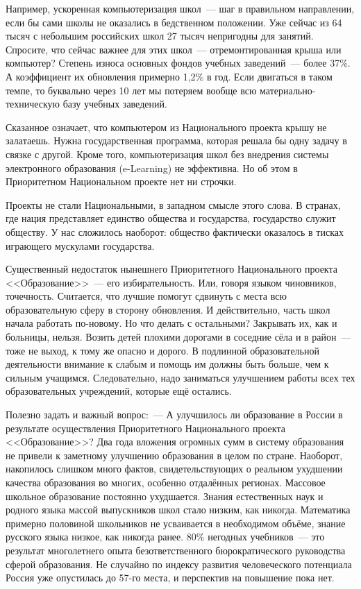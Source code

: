 \documentclass[article, 12pt, russian, oneside]{ncc}
\begin{document}
Например, ускоренная компьютеризация школ~--- шаг в правильном
направлении, если бы сами школы не оказались в бедственном
положении. Уже сейчас из 64 тысяч с небольшим российских школ 27 тысяч
непригодны для занятий. Спросите, что сейчас важнее для этих школ~---
отремонтированная крыша или компьютер? Степень износа основных фондов
учебных заведений~--- более 37\%. А коэффициент их обновления примерно
1,2\% в год. Если двигаться в таком темпе, то буквально через 10 лет
мы потеряем вообще всю материально-техническую базу учебных заведений.

Сказанное означает, что компьютером из Национального проекта крышу не
залатаешь. Нужна государственная программа, которая решала бы одну
задачу в связке с другой. Кроме того, компьютеризация школ без
внедрения системы электронного образования (e-Learning) не
эффективна. Но об этом в Приоритетном Национальном проекте нет ни
строчки.

Проекты не стали Национальными, в западном смысле этого слова. В
странах, где нация представляет единство общества и государства,
государство служит обществу. У нас сложилось наоборот: общество
фактически оказалось в тисках играющего мускулами государства.

Существенный недостаток нынешнего Приоритетного Национального проекта
<<Образование>>~--- его избирательность. Или, говоря языком
чиновников, точечность. Считается, что лучшие помогут сдвинуть с места
всю образовательную сферу в сторону обновления. И действительно, часть
школ начала работать по-новому. Но что делать с остальными? Закрывать
их, как и больницы, нельзя. Возить детей плохими дорогами в соседние
сёла и в район~--- тоже не выход, к тому же опасно и дорого. В
подлинной образовательной деятельности внимание к слабым и помощь им
должны быть больше, чем к сильным учащимся. Следовательно, надо
заниматься улучшением работы всех тех образовательных учреждений,
которые ещё остались.

Полезно задать и важный вопрос:~--- А улучшилось ли образование в
России в результате осуществления Приоритетного Национального проекта
<<Образование>>? Два года вложения огромных сумм в систему образования
не привели к заметному улучшению образования в целом по
стране. Наоборот, накопилось слишком много фактов, свидетельствующих о
реальном ухудшении качества образования во многих, особенно отдалённых
регионах. Массовое школьное образование постоянно ухудшается. Знания
естественных наук и родного языка массой выпускников школ стало
низким, как никогда. Математика примерно половиной школьников не
усваивается в необходимом объёме, знание русского языка низкое, как
никогда ранее.  80\% негодных учебников~--- это результат многолетнего
опыта безответственного бюрократического руководства сферой
образования. Не случайно по индексу развития человеческого потенциала
Россия уже опустилась до 57-го места, и перспектив на повышение пока
нет.
\newpage
\end{document}
